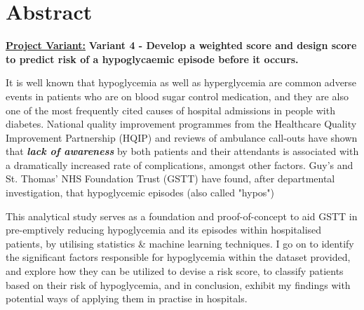 
\section*{Abstract}


    \textbf{\underline{Project Variant:}} \textbf{ Variant 4 - Develop a weighted score and design score to predict risk of a hypoglycaemic episode before it occurs.} 

    \vspace{10pt}
    \par{It is well known that hypoglycemia as well as hyperglycemia are common adverse events in patients who are on blood sugar control medication, and they are also one of the most frequently cited causes of hospital admissions in people with diabetes. National quality improvement programmes from the Healthcare Quality Improvement Partnership (HQIP) and reviews of ambulance call-outs have shown that \textbf{\textit{lack of awareness}} by both patients and their attendants is associated with a dramatically increased rate of complications, amongst other factors. Guy's and St. Thomas' NHS Foundation Trust (GSTT) have found, after departmental investigation, that hypoglycemic episodes (also called "hypos") }

    \vspace{10pt}
    \par{This analytical study serves as a foundation and proof-of-concept to aid GSTT in pre-emptively reducing hypoglycemia and its episodes within hospitalised patients, by utilising statistics \& machine learning techniques. I go on to identify the significant factors responsible for hypoglycemia within the dataset provided, and explore how they can be utilized to devise a risk score, to classify patients based on their risk of hypoglycemia, and in conclusion, exhibit my findings with potential ways of applying them in practise in hospitals.}

    \vspace{10pt}

    \par{}


